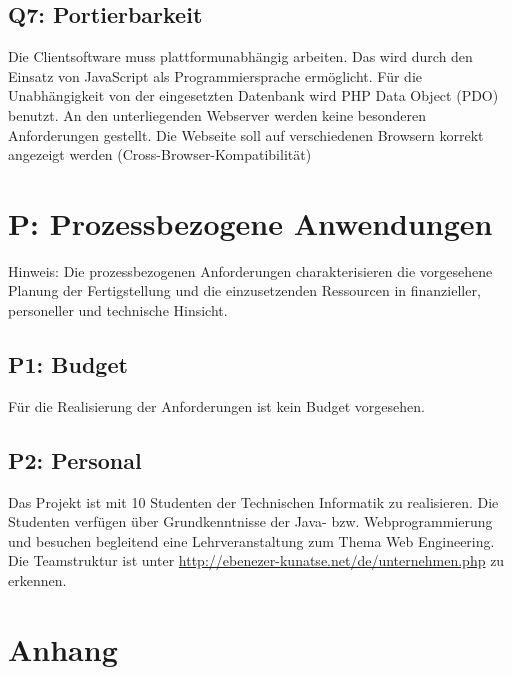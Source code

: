 \documentclass[10pt,a4paper]{scrartcl}
\begin{document}
\subsection{Q7: Portierbarkeit}
Die Clientsoftware muss plattformunabhängig arbeiten. Das wird durch den Einsatz von JavaScript als Programmiersprache ermöglicht. Für die Unabhängigkeit von der eingesetzten Datenbank wird PHP Data Object (PDO) benutzt. An den unterliegenden Webserver werden keine besonderen Anforderungen gestellt. Die Webseite soll auf verschiedenen Browsern korrekt angezeigt werden (Cross-Browser-Kompatibilität)


\section{P: Prozessbezogene Anwendungen}
Hinweis: Die prozessbezogenen Anforderungen charakterisieren die vorgesehene Planung der Fertigstellung und die einzusetzenden Ressourcen in finanzieller, personeller und technische Hinsicht.

\subsection{P1: Budget}
Für die Realisierung der Anforderungen ist kein Budget vorgesehen.


\subsection{P2: Personal}
Das Projekt ist mit 10 Studenten der Technischen Informatik zu realisieren. Die Studenten verfügen über Grundkenntnisse der Java- bzw. Webprogrammierung und besuchen begleitend eine Lehrveranstaltung zum Thema Web Engineering. Die Teamstruktur ist unter \url{http://ebenezer-kunatse.net/de/unternehmen.php} zu erkennen.

\newpage
\section{Anhang}
\end{document}
